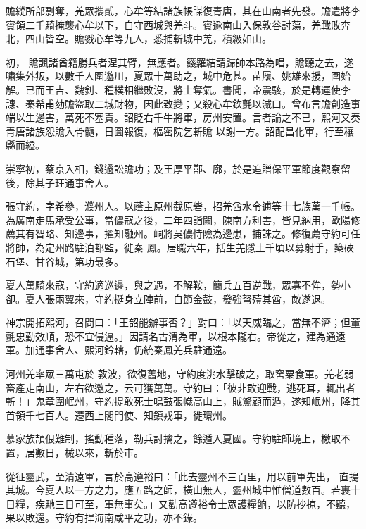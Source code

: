 \begin{pinyinscope}
 贍縱所部剽奪，羌眾攜貳，心牟等結諸族帳謀復青唐，其在山南者先發。贍遣將李賓領二千騎掩襲心牟以下，自守西城與羌斗。賓逾南山入保敦谷討蕩，羌戰敗奔北，四山皆空。贍戮心牟等九人，悉捕斬城中羌，積級如山。



 初，
 贍諷諸酋籍勝兵者涅其臂，無應者。籛羅結請歸帥本路為唱，贍聽之去，遂嘯集外叛，以數千人圍邈川，夏眾十萬助之，城中危甚。苗履、姚雄來援，圍始解。已而王吉、魏釗、種樸相繼敗沒，將士奪氣。書聞，帝震駭，於是轉運使李譓、秦希甫劾贍盜取二城財物，因此致變；又殺心牟欽氈以滅口。曾布言贍創造事端以生邊害，萬死不塞責。詔貶右千牛將軍，房州安置。言者論之不已，熙河又奏青唐諸族怨贍入骨髓，日圖報復，樞密院乞斬贍
 以謝一方。詔配昌化軍，行至穰縣而縊。



 崇寧初，蔡京入相，錢遹訟贍功；及王厚平鄯、廓，於是追贈保平軍節度觀察留後，除其子玨通事舍人。



 張守約，字希參，濮州人。以蔭主原州截原砦，招羌酋水令逋等十七族萬一千帳。為廣南走馬承受公事，當儂寇之後，二年四詣闕，陳南方利害，皆見納用，歐陽修薦其有智略、知邊事，擢知融州。峒將吳儂恃險為邊患，捕誅之。修復薦守約可任將帥，為定州路駐泊都監，徙秦
 鳳。居職六年，括生羌隱土千頃以募射手，築硤石堡、甘谷城，第功最多。



 夏人萬騎來寇，守約適巡邊，與之遇，不解鞍，簡兵五百逆戰，眾寡不侔，勢小卻。夏人張兩翼來，守約挺身立陣前，自節金鼓，發強弩殪其酋，敵遂退。



 神宗開拓熙河，召問曰：「王韶能辦事否？」對曰：「以天威臨之，當無不濟；但董氈忠勤效順，恐不宜侵逼。」因請名古渭為軍，以根本隴右。帝從之，建為通遠軍。加通事舍人、熙河鈐轄，仍統秦鳳羌兵駐通遠。



 河州羌率眾三萬屯於
 敦波，欲復舊地，守約度洮水擊破之，取窖粟食軍。羌老弱畜產走南山，左右欲邀之，云可獲萬萬。守約曰：「彼非敢迎戰，逃死耳，輒出者斬！」鬼章圍岷州，守約提敢死士鳴鼓張幟高山上，賊驚顧而遁，遂知岷州，降其首領千七百人。遷西上閣門使、知鎮戎軍，徙環州。



 慕家族頡佷難制，搖動種落，勒兵討擒之，餘遁入夏國。守約駐師境上，檄取不置，居數日，械以來，斬於市。



 從征靈武，至清遠軍，言於高遵裕曰：「此去靈州不三百里，用以前軍先出，
 直搗其城。今夏人以一方之力，應五路之師，橫山無人，靈州城中惟僧道數百。若裹十日糧，疾馳三日可至，軍無事矣。」又勸高遵裕令士眾護糧餉，以防抄掠，不聽，果以敗還。守約有捍海南咸平之功，亦不錄。




\end{pinyinscope}
